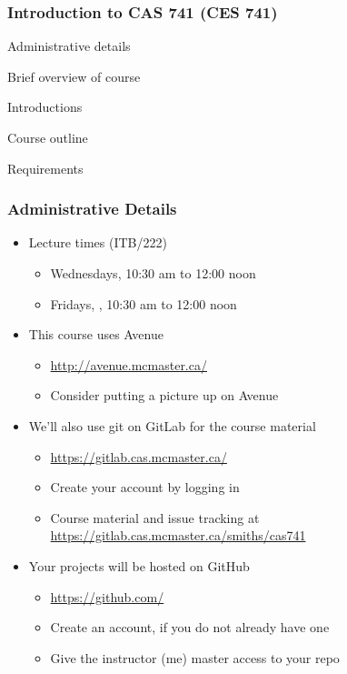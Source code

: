 \documentclass[t,12pt,numbers,fleqn]{beamer}
\begin{document}




\begin{frame}
\frametitle{Introduction to CAS 741 (CES 741)}

\bi
\item Administrative details
\item Brief overview of course
\item Introductions
\item Course outline
\item Requirements
\ei
\end{frame}


\begin{frame}
\frametitle{Administrative Details}

\begin{itemize}

\item Lecture times (ITB/222)
\begin{itemize}
\item Wednesdays, 10:30 am to 12:00 noon
\item Fridays, , 10:30 am to 12:00 noon
\end{itemize}
\item This course uses Avenue
\begin{itemize}
\item \url{http://avenue.mcmaster.ca/} 
\item Consider putting a picture up on Avenue
\end{itemize}
\item We'll also use git on GitLab for the course material
\begin{itemize}
\item \url{https://gitlab.cas.mcmaster.ca/}
\item Create your account by logging in
\item Course material and issue tracking at \url{https://gitlab.cas.mcmaster.ca/smiths/cas741}
\end{itemize}
\item Your projects will be hosted on GitHub
\begin{itemize}
\item \url{https://github.com/}
\item Create an account, if you do not already have one
\item Give the instructor (me) master access to your repo
\end{itemize}

\end{itemize}

\end{frame}
\end{document}
